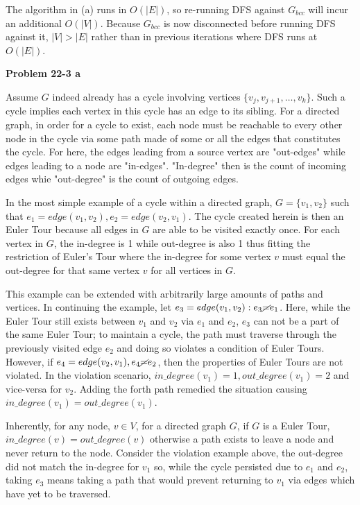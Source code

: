 \documentclass{article}
\begin{document}
The algorithm in (a) runs in $O(|E|)$, so re-running DFS against $G_{bcc}$ will
incur an additional $O(|V|)$. Because $G_{bcc}$ is now disconnected before 
running DFS against it, $|V| > |E|$ rather than in previous iterations where DFS
runs at $O(|E|)$. 

\textbf{Problem 22-3 a} 

Assume $G$ indeed already has a cycle involving vertices $\{v_j, v_{j+1}, 
\ldots, v_k\}$. Such a cycle implies each vertex in this cycle has an edge to 
its sibling. For a directed graph, in order for a cycle to exist, each node must
be reachable to every other node in the cycle via some path made of some or all
the edges that constitutes the cycle. For here, the edges leading from a source 
vertex are "out-edges" while edges leading to a node are "in-edges". "In-degree"
then is the count of incoming edges whie "out-degree" is the count of outgoing 
edges. 

In the most simple example of a cycle within a directed graph, $G = \{v_1 , 
v_2\}$ such that $e_1 = edge(v_1 , v_2), e_2 = edge(v_2, v_1) $. The cycle 
created herein is then an Euler Tour because all edges in $G$ are able to be 
visited exactly once. For each vertex in $G$, the in-degree is 1 while 
out-degree is also 1 thus fitting the restriction of Euler's Tour where the 
in-degree for some vertex $v$ must equal the out-degree for that same vertex $v$
for all vertices in $G$. 

This example can be extended with arbitrarily large amounts of paths and 
vertices. In continuing the example, let $e_3 = edge(v_1, v_2): e_3 \cancel{=} 
e_1$. Here, while the Euler Tour still exists between $v_1$ and $v_2$ via $e_1$ 
and $e_2$, $e_3$ can not be a part of the same Euler Tour; to maintain a cycle, 
the path must traverse through the previously visited edge $e_2$ and doing so 
violates a condition of Euler Tours. However, if $e_4 = edge(v_2, v_1), e_4 
\cancel{=} e_2$, then the properties of Euler Tours are not violated. In the 
violation scenario, $in\_degree(v_1) = 1, out\_degree(v_1) = 2$ and vice-versa 
for $v_2$. Adding the forth path remedied the situation causing $in\_degree(v_1)
= out\_degree(v_1)$. 

Inherently, for any node, $v \in V$, for a directed graph $G$, if $G$ is a Euler
 Tour, $in\_degree(v) = out\_degree(v)$ otherwise a path exists to leave a node 
 and never return to the node. Consider the violation example above, the 
 out-degree did not match the in-degree for $v_1$ so, while the cycle persisted 
 due to $e_1$ and $e_2$, taking $e_3$ means taking a path that would prevent 
 returning to $v_1$ via edges which have yet to be traversed. 
\end{document}
